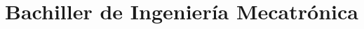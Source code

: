 \documentclass[11pt,a4paper,sans]{moderncv}
\title{Bachiller de Ingeniería Mecatrónica}
\begin{document}
\makecvtitle











\end{document}
